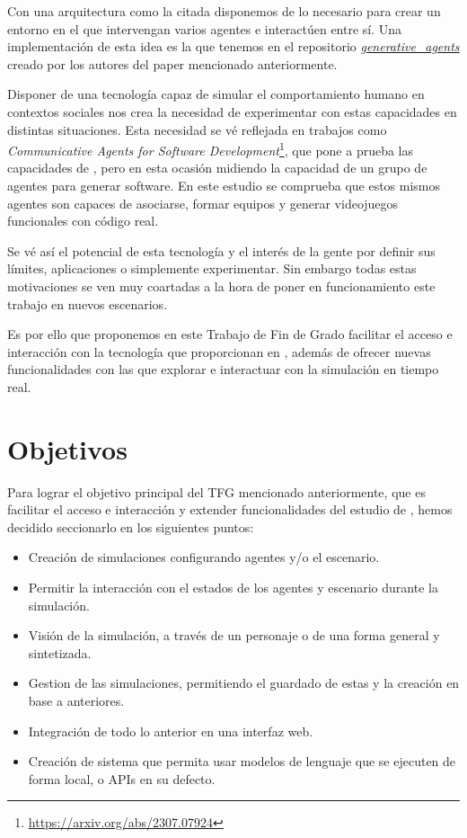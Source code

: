 Con una arquitectura como la citada disponemos de lo necesario para crear un entorno en el que intervengan varios agentes e interactúen entre sí. Una implementación de esta idea es la que tenemos en el repositorio \href{https://github.com/joonspk-research/generative_agents}{\textit{generative\_agents}} creado por los autores del paper mencionado anteriormente.

Disponer de una tecnología capaz de simular el comportamiento humano en contextos sociales nos crea la necesidad de experimentar con estas capacidades en distintas situaciones. Esta necesidad se vé reflejada en trabajos como \textit{Communicative Agents for Software Development}\footnote{\url{https://arxiv.org/abs/2307.07924}}, que pone a prueba las capacidades de \ga, pero en esta ocasión midiendo la capacidad de un grupo de agentes para generar software. En este estudio se comprueba que estos mismos agentes son capaces de asociarse, formar equipos y generar videojuegos funcionales con código real.

Se vé así el potencial de esta tecnología y el interés de la gente por definir sus límites, aplicaciones o simplemente experimentar.
Sin embargo todas estas motivaciones se ven muy coartadas a la hora de poner en funcionamiento este trabajo en nuevos escenarios.

Es por ello que proponemos en este Trabajo de Fin de Grado facilitar el acceso e interacción con la tecnología que proporcionan en \ga, además de ofrecer nuevas funcionalidades con las que explorar e interactuar con la simulación en tiempo real.

\section{Objetivos}
Para lograr el objetivo principal del TFG mencionado anteriormente, que es facilitar el acceso e interacción y extender funcionalidades del estudio de  \ga, hemos decidido seccionarlo en los siguientes puntos:
\begin{itemize}
\item Creación de simulaciones configurando agentes y/o el escenario.
\item Permitir la interacción con el estados de los agentes y escenario durante la simulación.
\item Visión de la simulación, a través de un personaje o de una forma general y sintetizada.
\item Gestion de las simulaciones, permitiendo el guardado de estas y la creación en base a anteriores.
\item Integración de todo lo anterior en una interfaz web.
\item Creación de sistema que permita usar modelos de lenguaje que se ejecuten de forma local, o APIs en su defecto.
\end{itemize}


